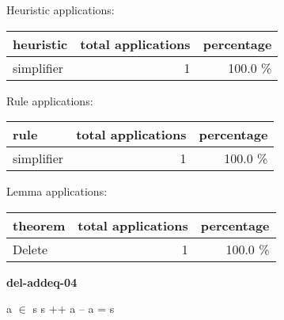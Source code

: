 \documentclass[a4paper]{article}
\begin{document}
Heuristic applications:

\begin{supertabular}{l|r|r}
heuristic	& total applications & percentage \\ \hline
simplifier & 1 & 100.0 \% \\

\end{supertabular}

Rule applications:

\begin{supertabular}{l|r|r}
rule	        & total applications & percentage \\ \hline
simplifier & 1 & 100.0 \% \\

\end{supertabular}

Lemma applications:

\begin{supertabular}{l|r|r}
theorem	        & total applications & percentage \\ \hline
Delete & 1 & 100.0 \% \\

\end{supertabular}
\pagebreak

{\LARGE\bf del-addeq-04}\label{lemma-del-addeq-04}

\medskip

 \Fol \Not a $\in$ s \Imp s ++ a -- a = s
\end{document}
